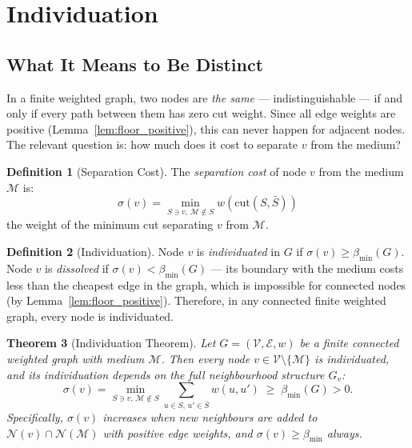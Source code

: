\documentclass[11pt,twocolumn,a4paper]{article}
\theoremstyle{plain}
\newtheorem{theorem}{Theorem}[section]
\theoremstyle{definition}
\newtheorem{definition}[theorem]{Definition}
\theoremstyle{remark}
\newcommand{\cut}{\mathrm{cut}}
\newcommand{\med}{\mathcal{M}}
\newcommand{\Nbd}{\mathcal{N}}
\newcommand{\Ecal}{\mathcal{E}}
\newcommand{\Vcal}{\mathcal{V}}
\newcommand{\bmin}{\beta_{\min}}
\begin{document}
\section{Individuation}
\label{sec:individuation}

\subsection{What It Means to Be Distinct}

In a finite weighted graph, two nodes are \emph{the same} --- indistinguishable
--- if and only if every path between them has zero cut weight. Since all
edge weights are positive (Lemma~\ref{lem:floor_positive}), this can never
happen for adjacent nodes. The relevant question is: how much does it cost
to separate $v$ from the medium?

\begin{definition}[Separation Cost]
\label{def:sepcost}
The \emph{separation cost} of node $v$ from the medium $\med$ is:
\[
  \sigma(v) = \min_{S \ni v,\, \med \notin S} w(\cut(S, \bar{S}))
\]
the weight of the minimum cut separating $v$ from $\med$.
\end{definition}

\begin{definition}[Individuation]
\label{def:individuation}
Node $v$ is \emph{individuated} in $G$ if $\sigma(v) \geq \bmin(G)$.
Node $v$ is \emph{dissolved} if $\sigma(v) < \bmin(G)$ --- its boundary
with the medium costs less than the cheapest edge in the graph, which is
impossible for connected nodes (by Lemma~\ref{lem:floor_positive}). Therefore,
in any connected finite weighted graph, every node is individuated.
\end{definition}

\begin{theorem}[Individuation Theorem]
\label{thm:individuation}
Let $G = (\Vcal, \Ecal, w)$ be a finite connected weighted graph with medium
$\med$. Then every node $v \in \Vcal \setminus \{\med\}$ is individuated, and
its individuation depends on the full neighbourhood structure $G_v$:
\[
  \sigma(v) = \min_{S \ni v,\, \med \notin S} \sum_{u \in S,\, u' \in \bar{S}}
  w(u, u') \;\geq\; \bmin(G) > 0.
\]
Specifically, $\sigma(v)$ increases when new neighbours are added to $\Nbd(v)
\cap \Nbd(\med)$ with positive edge weights, and $\sigma(v) \geq \bmin$ always.
\end{theorem}
\end{document}
